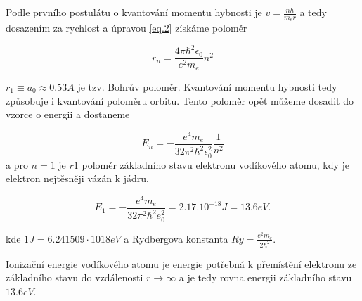 Podle prvního postulátu o kvantování momentu hybnosti je $v = \frac{n\bar h}{m_e r}$ a tedy dosazením za rychlost a úpravou \ref{eq.2} získáme poloměr 

\begin{equation}
r_n = \frac{4\pi \hbar^2 \epsilon_0}{e^2 m_e} n^2
\end{equation} 

$r_1 \equiv a_0 \approx 0.53 A$ je tzv. Bohrův poloměr. Kvantování momentu hybnosti tedy způsobuje i kvantování poloměru orbitu. Tento poloměr opět můžeme dosadit do vzorce o energii a dostaneme

$$
    E_n = -\frac{e^4 m_e}{32\pi^2 \hbar^2 \epsilon_0^2} \frac{1}{n^2}
$$
a pro $n = 1$ je $r1$ poloměr základního stavu elektronu vodíkového atomu, kdy je elektron nejtěsněji vázán k jádru.

\begin{equation}
    E_1 = -\frac{e^4 m_e}{32\pi^2 \hbar^2 e_0^2} = 2.17 . 10^{-18} J = 13.6 eV.
\end{equation}

kde $1J = 6.241509⋅1018 eV$ a Rydbergova konstanta $Ry = \frac{e^2 m_e}{2\hbar^2}$.

\vspace{0.5cm}

Ionizační energie vodíkového atomu je energie potřebná k přemístění elektronu ze základního stavu do vzdálenosti $r \to \infty$ a je tedy rovna energii základního stavu $13.6 eV$.




